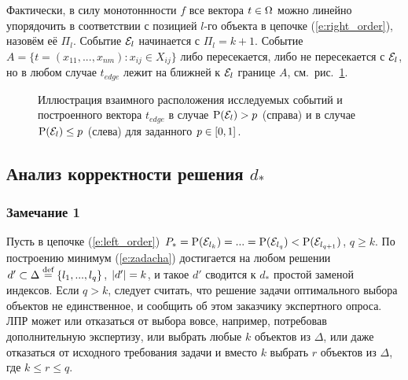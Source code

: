 \documentclass{article}
\begin{document}
Фактически, в силу монотоннности $f$ все вектора $t \in \Omega$ можно линейно упорядочить в соответствии с позицией $l$-го объекта в цепочке (\ref{e:right_order}), назовём её $\Pi_l$. Событие $\mathcal{E}_l$ начинается с $\Pi_l = k+1$. Событие $A = \{t = (x_{11}, ..., x_{nm}): x_{ij} \in X_{ij}\}$ либо пересекается, либо не пересекается с $\mathcal{E}_l$, но в любом случае $t_{edge}$ лежит на ближней к $\mathcal{E}_l$ границе $A$, см.~рис.~\ref{ris:algo_sets}. 

\begin{figure}[h]
\caption{\small Иллюстрация взаимного расположения исследуемых событий и построенного вектора $t_{edge}$ в случае ${\mathrm{P}}(\mathcal{E}_l) > p$ (справа) и в случае ${\mathrm{P}}(\mathcal{E}_l) \leq p$ (слева) для заданного $p \in [0,1]$.}
\label{ris:algo_sets}
\end{figure}




\subsection{Анализ корректности решения $d_*$}
\subsubsection*{Замечание 1}

Пусть в цепочке (\ref{e:left_order}) $P_* = {\mathrm{P}}(\mathcal{E}_{l_k}) = ... = {\mathrm{P}}(\mathcal{E}_{l_q}) < {\mathrm{P}}(\mathcal{E}_{l_{q+1}})$, $q \geq k$. По построению минимум (\ref{e:zadacha}) достигается на любом решении $d' \subset \Delta \overset{\text{def}}{=} \{l_1, ..., l_q\}$, $\left| d' \right| = k$, и такое $d'$ сводится к $d_*$ простой заменой индексов. Если $q > k$, следует считать, что решение задачи оптимального выбора объектов не единственное, и сообщить об этом заказчику экспертного опроса. ЛПР может или отказаться от выбора вовсе, например, потребовав дополнительную экспертизу, или выбрать любые $k$ объектов из $\Delta$, или даже отказаться от исходного требования задачи и вместо $k$ выбрать $r$ объектов из $\Delta$, где $k \leq r \leq q$.
\end{document}
